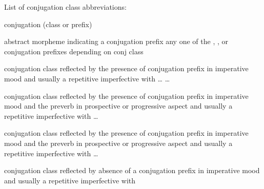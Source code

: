 \vspace{\baselineskip}
\noindent
List of conjugation class abbreviations:
\begin{description}[font={\normalfont}, style=sameline, labelindent=\parindent, labelwidth=3em, leftmargin=!]
\item[conj]	conjugation (class or prefix)
\item[\fm{\xx{cnj}-}]
		abstract morpheme indicating a conjugation prefix\newline
		any one of the , , or  conjugation prefixes
			depending on conj class
\item[\fm{n}]	 conjugation class\newline
		reflected by the presence of  conjugation prefix in imperative mood\newline
		and usually a repetitive imperfective with  …  … 
\item[\fm{g̱}]	 conjugation class\newline
		reflected by the presence of  conjugation prefix in imperative mood\newline
		and the  preverb in prospective or progressive aspect\newline
		and usually a repetitive imperfective with  … 
\item[\fm{g}]	 conjugation class\newline
		reflected by the presence of  conjugation prefix in imperative mood\newline
		and the  preverb in prospective or progressive aspect
		and usually a repetitive imperfective with  … 
\item[\fm{∅}]	 conjugation class\newline
		reflected by absence of a conjugation prefix in imperative mood\newline
		and usually a repetitive imperfective with 
\end{description}

